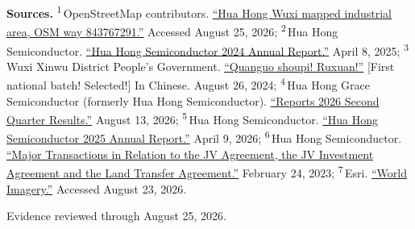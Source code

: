 \begin{minipage}[t][0.90\textheight][t]{\textwidth}
{\sffamily\scriptsize\setlength{\emergencystretch}{1.5em}\textbf{Sources.} \textsuperscript{1}\,OpenStreetMap contributors. \href{\detokenize{https://www.openstreetmap.org/way/843767291}}{\enquote{Hua Hong Wuxi mapped industrial area, OSM way 843767291.}} Accessed August 25, 2026; \textsuperscript{2}\,Hua Hong Semiconductor. \href{\detokenize{https://www1.hkexnews.hk/listedco/listconews/sehk/2025/0408/2025040800831.pdf}}{\enquote{Hua Hong Semiconductor 2024 Annual Report.}} April 8, 2025; \textsuperscript{3}\,Wuxi Xinwu District People's Government. \href{\detokenize{https://www.wnd.gov.cn/doc/2024/08/26/4380012.shtml}}{\enquote{Quanguo shoupi! Ruxuan!}} [First national batch! Selected!] In Chinese. August 26, 2024; \textsuperscript{4}\,Hua Hong Grace Semiconductor (formerly Hua Hong Semiconductor). \href{\detokenize{https://www1.hkexnews.hk/listedco/listconews/sehk/2026/0813/2026081300401.pdf}}{\enquote{Reports 2026 Second Quarter Results.}} August 13, 2026; \textsuperscript{5}\,Hua Hong Semiconductor. \href{\detokenize{https://www1.hkexnews.hk/listedco/listconews/sehk/2026/0409/2026040901618_c.pdf}}{\enquote{Hua Hong Semiconductor 2025 Annual Report.}} April 9, 2026; \textsuperscript{6}\,Hua Hong Semiconductor. \href{\detokenize{https://www1.hkexnews.hk/listedco/listconews/sehk/2023/0224/2023022400027.pdf}}{\enquote{Major Transactions in Relation to the JV Agreement, the JV Investment Agreement and the Land Transfer Agreement.}} February 24, 2023; \textsuperscript{7}\,Esri. \href{\detokenize{https://www.arcgis.com/home/item.html?id=10df2279f9684e4a9f6a7f08febac2a9}}{\enquote{World Imagery.}} Accessed August 23, 2026.\par}
\vfill
\noindent{\color{hairline}\rule{\linewidth}{0.4pt}}\par\smallskip
{\sffamily\scriptsize\color{black!58} Evidence reviewed through August 25, 2026.\par}
\end{minipage}
\clearpage
